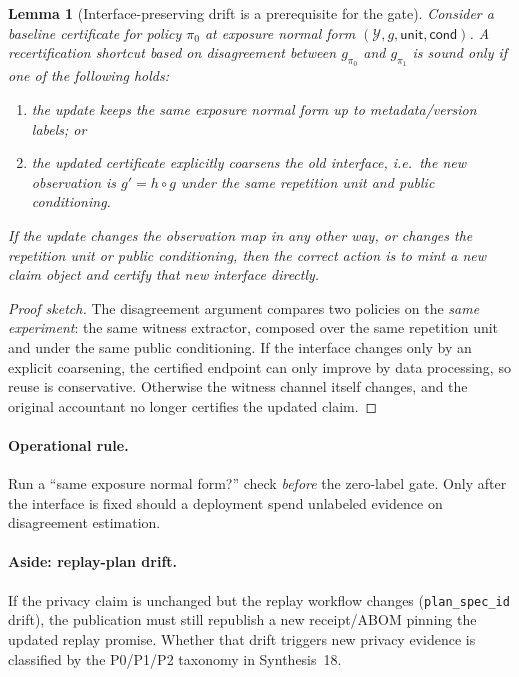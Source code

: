 \documentclass[11pt]{article}
\newtheorem{lemma}{Lemma}
\begin{document}
\begin{lemma}[Interface-preserving drift is a prerequisite for the gate]
\label{lem:sameclaimfirst}
Consider a baseline certificate for policy $\pi_0$ at exposure normal form $(\mathcal Y,g,\mathsf{unit},\mathsf{cond})$.
A recertification shortcut based on disagreement between $g_{\pi_0}$ and $g_{\pi_1}$ is sound only if one of the following holds:
\begin{enumerate}[leftmargin=*]
\item the update keeps the same exposure normal form up to metadata/version labels; or
\item the updated certificate explicitly coarsens the old interface, i.e.\ the new observation is $g' = h\circ g$ under the same repetition unit and public conditioning.
\end{enumerate}
If the update changes the observation map in any other way, or changes the repetition unit or public conditioning, then the correct action is to mint a new claim object and certify that new interface directly.
\end{lemma}

\begin{proof}[Proof sketch]
The disagreement argument compares two policies on the \emph{same experiment}: the same witness extractor, composed over the same repetition unit and under the same public conditioning.
If the interface changes only by an explicit coarsening, the certified endpoint can only improve by data processing, so reuse is conservative.
Otherwise the witness channel itself changes, and the original accountant no longer certifies the updated claim.
\end{proof}

\paragraph{Operational rule.}
Run a ``same exposure normal form?'' check \emph{before} the zero-label gate.
Only after the interface is fixed should a deployment spend unlabeled evidence on disagreement estimation.

\paragraph{Aside: replay-plan drift.}
If the privacy claim is unchanged but the replay workflow changes (\texttt{plan\_spec\_id} drift), the publication must still republish a new receipt/ABOM pinning the updated replay promise.
Whether that drift triggers new privacy evidence is classified by the P0/P1/P2 taxonomy in Synthesis~18.\cite{series:planstateequiv}
\end{document}
